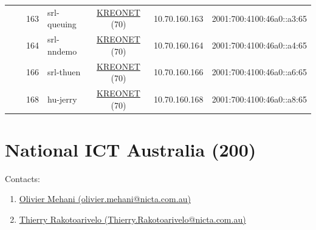 \begin{small}
\begin{center}
\begin{longtable}{|c|c|c|c|c|c|c|c|}
  &  & \tiny{163} & \multicolumn{1}{|l|}{\tiny{srl-queuing}} & \multicolumn{2}{|c|}{\tiny{\href{http://www.kreonet.net}{KREONET} (70)}} & \tiny{10.70.160.163} & \tiny{2001:700:4100:46a0::a3:65} \\* \cline{3-3}\cline{4-4}\cline{5-5}\cline{6-6}\cline{7-7}\cline{8-8}
  &  & \tiny{164} & \multicolumn{1}{|l|}{\tiny{srl-nndemo}} & \multicolumn{2}{|c|}{\tiny{\href{http://www.kreonet.net}{KREONET} (70)}} & \tiny{10.70.160.164} & \tiny{2001:700:4100:46a0::a4:65} \\* \cline{3-3}\cline{4-4}\cline{5-5}\cline{6-6}\cline{7-7}\cline{8-8}
  &  & \tiny{166} & \multicolumn{1}{|l|}{\tiny{srl-thuen}} & \multicolumn{2}{|c|}{\tiny{\href{http://www.kreonet.net}{KREONET} (70)}} & \tiny{10.70.160.166} & \tiny{2001:700:4100:46a0::a6:65} \\* \cline{3-3}\cline{4-4}\cline{5-5}\cline{6-6}\cline{7-7}\cline{8-8}
  &  & \tiny{168} & \multicolumn{1}{|l|}{\tiny{hu-jerry}} & \multicolumn{2}{|c|}{\tiny{\href{http://www.kreonet.net}{KREONET} (70)}} & \tiny{10.70.160.168} & \tiny{2001:700:4100:46a0::a8:65} \\ \hline
\end{longtable}
\end{center}
\end{small}



\section{National ICT Australia (200)}
\label{sec:NICTA}

Contacts:\begin{enumerate}
 \item {}\href{mailto:olivier.mehani@nicta.com.au}{Olivier Mehani (olivier.mehani@nicta.com.au)}
 \item {}\href{mailto:Thierry.Rakotoarivelo@nicta.com.au}{Thierry Rakotoarivelo (Thierry.Rakotoarivelo@nicta.com.au)}
\end{enumerate}


